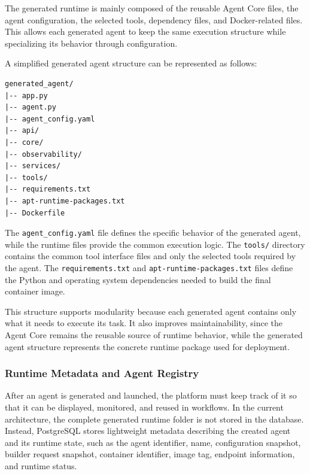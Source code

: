 The generated runtime is mainly composed of the reusable Agent Core files, the agent configuration, the selected tools, dependency files, and Docker-related files. This allows each generated agent to keep the same execution structure while specializing its behavior through configuration.

A simplified generated agent structure can be represented as follows:

\begin{center}
\begin{minipage}{0.9\textwidth}
\small
\begin{verbatim}
generated_agent/
|-- app.py
|-- agent.py
|-- agent_config.yaml
|-- api/
|-- core/
|-- observability/
|-- services/
|-- tools/
|-- requirements.txt
|-- apt-runtime-packages.txt
|-- Dockerfile
\end{verbatim}
\end{minipage}
\end{center}

The \texttt{agent\_config.yaml} file defines the specific behavior of the generated agent, while the runtime files provide the common execution logic. The \texttt{tools/} directory contains the common tool interface files and only the selected tools required by the agent. The \texttt{requirements.txt} and \texttt{apt-runtime-packages.txt} files define the Python and operating system dependencies needed to build the final container image.

This structure supports modularity because each generated agent contains only what it needs to execute its task. It also improves maintainability, since the Agent Core remains the reusable source of runtime behavior, while the generated agent structure represents the concrete runtime package used for deployment.

\subsubsection{Runtime Metadata and Agent Registry}

After an agent is generated and launched, the platform must keep track of it so that it can be displayed, monitored, and reused in workflows. In the current architecture, the complete generated runtime folder is not stored in the database. Instead, PostgreSQL stores lightweight metadata describing the created agent and its runtime state, such as the agent identifier, name, configuration snapshot, builder request snapshot, container identifier, image tag, endpoint information, and runtime status.

